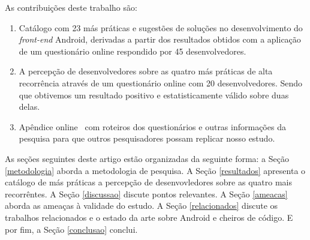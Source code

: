 As contribuições deste trabalho são:

\begin{enumerate}

	\item Catálogo com 23 más práticas e sugestões de soluções no desenvolvimento do \textit{front-end} Android, derivadas a partir dos resultados obtidos com a aplicação de um questionário online respondido por 45 desenvolvedores.

	\item A percepção de desenvolvedores sobre as quatro más práticas de alta recorrência através de um questionário online com 20 desenvolvedores. Sendo que obtivemos um resultado positivo e estatisticamente válido sobre duas delas.

	\item Apêndice online~\cite{apendice} com roteiros dos questionários e outras informações da pesquisa para que outros pesquisadores possam replicar nosso estudo.

\end{enumerate}



As seções seguintes deste artigo estão organizadas da seguinte forma: a Seção \ref{metodologia} aborda a metodologia de pesquisa. A Seção \ref{resultados} apresenta o catálogo de más práticas a percepção de desenvovledores sobre as quatro mais recorrêntes. A Seção \ref{discussao} discute pontos relevantes. A Seção \ref{ameacas} aborda as ameaças à validade do estudo. A Seção \ref{relacionados} discute os trabalhos relacionados e o estado da arte sobre Android e cheiros de código. E por fim, a Seção \ref{conclusao} conclui.
